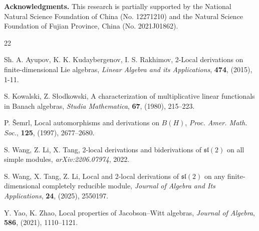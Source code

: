 \documentclass[12pt,reqno]{amsart}
\theoremstyle{definition}
\theoremstyle{remark}
\numberwithin{equation}{section}
\begin{document}
\vspace{2mm}
\noindent
{\bf Acknowledgments. } This research is partially supported by the National Natural Science Foundation of China (No. 12271210) and the Natural Science Foundation of Fujian Province, China (No. 2021J01862).

\begin{thebibliography}{22}

 Sh. A. Ayupov,  K.  K.  Kudaybergenov,  I. S. Rakhimov, 2-Local derivations on finite-dimensional Lie algebras, {\it Linear Algebra and its Applications}, \textbf{474}, (2015), 1-11.

 S. Kowalski, Z. S{\l}odkowski, A characterization of multiplicative linear functionals in {B}anach algebras, {\it Studia Mathematica}, \textbf{67}, (1980), 215--223.

 P. \v{S}emrl,  Local automorphisms and derivations on $B(H)$, {\it Proc. Amer. Math. Soc.}, \textbf{125}, (1997), 2677--2680.

 S. Wang, Z. Li, X. Tang, 2-local derivations and biderivations of $\mathfrak{sl}(2)$ on all simple modules, {\it arXiv:2206.07974}, 2022.

 S. Wang, X. Tang, Z. Li, Local and 2-local derivations of {$\mathfrak{sl}(2)$} on any finite-dimensional completely reducible module, {\it Journal of Algebra and Its Applications}, \textbf{24}, (2025), 2550197.
    
 Y. Yao, K. Zhao, Local properties of {J}acobson--{W}itt algebras, {\it Journal of Algebra}, \textbf{586}, (2021), 1110--1121.

\end{thebibliography}
\end{document}
